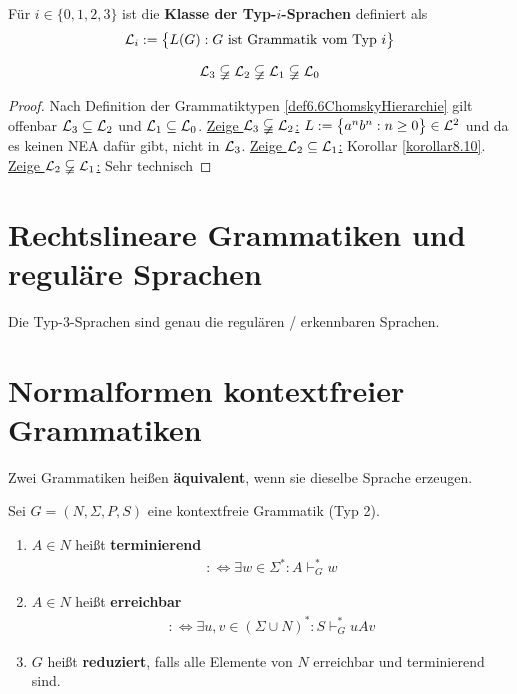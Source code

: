 \begin{definition}\label{def6.7Sprachklassen}
	Für $i\in\lbrace0,1,2,3\rbrace$ ist die \textbf{Klasse der Typ-$i$-Sprachen} definiert als
	\begin{align*}
		\mathcal{L}_i:=\big\lbrace L(G):G\text{ ist Grammatik vom Typ }i\big\rbrace
	\end{align*}
\end{definition}

\begin{satz}
	\begin{align*}
		\mathcal{L}_3\varsubsetneqq\mathcal{L}_2\varsubsetneqq\mathcal{L}_1\varsubsetneqq\mathcal{L}_0
	\end{align*}
\end{satz}

\begin{proof}
	Nach Definition der Grammatiktypen \ref{def6.6ChomskyHierarchie} gilt offenbar $\mathcal{L}_3\subseteq \mathcal{L}_2$ und $\mathcal{L}_1\subseteq\mathcal{L}_0$.\nl
	\underline{Zeige $\mathcal{L}_3\varsubsetneqq\mathcal{L}_2$:} 
	$L:=\big\lbrace a^nb^n:n\geq0\big\rbrace\in\mathcal{L}^2$ und da es keinen NEA dafür gibt, nicht in $\mathcal{L}_3$.\nl
	\underline{Zeige $\mathcal{L}_2\subseteq\mathcal{L}_1$:} Korollar \ref{korollar8.10}.\nl
	\underline{Zeige $\mathcal{L}_2\varsubsetneqq\mathcal{L}_1$:} Sehr technisch
\end{proof}

\section{Rechtslineare Grammatiken und reguläre Sprachen}

\begin{satz}\label{satz7.1}
	Die Typ-3-Sprachen sind genau die regulären / erkennbaren Sprachen.%
\end{satz}

\section{Normalformen kontextfreier Grammatiken}

Zwei Grammatiken heißen \textbf{äquivalent}, wenn sie dieselbe Sprache erzeugen.

\begin{definition}\label{def8.1}
	Sei $G=(N,\Sigma,P,S)$ eine kontextfreie Grammatik (Typ 2).
	\begin{enumerate}[label=\arabic*)]
		\item $A\in N$ heißt \textbf{terminierend}
		\begin{align*}
			:\Longleftrightarrow\exists w\in \Sigma^\ast:A\vdash_G^\ast w
		\end{align*}
		\item $A\in N$ heißt \textbf{erreichbar}
		\begin{align*}
			:\Longleftrightarrow\exists u,v\in(\Sigma\cup N)^\ast:S\vdash_G^\ast uAv
		\end{align*}
		\item $G$ heißt \textbf{reduziert}, falls alle Elemente von $N$ erreichbar und terminierend sind.
	\end{enumerate}
\end{definition}

